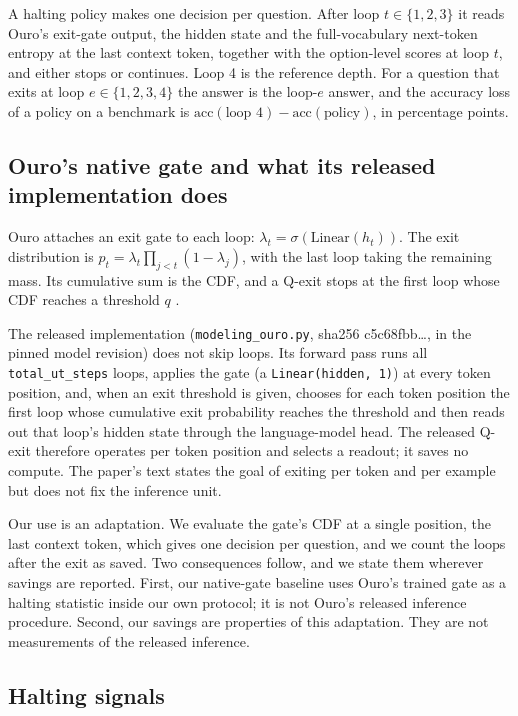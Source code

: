 A halting policy makes one decision per question. After loop \(t \in \{1,2,3\}\) it reads Ouro's exit-gate output, the hidden state and the full-vocabulary next-token entropy at the last context token, together with the option-level scores at loop \(t\), and either stops or continues. Loop 4 is the reference depth. For a question that exits at loop \(e \in \{1,2,3,4\}\) the answer is the loop-\(e\) answer, and the accuracy loss of a policy on a benchmark is \(\text{acc}(\text{loop }4) - \text{acc}(\text{policy})\), in percentage points.

\subsection{Ouro's native gate and what its released implementation does}

Ouro attaches an exit gate to each loop: \(\lambda_t = \sigma(\text{Linear}(h_t))\). The exit distribution is \(p_t = \lambda_t \prod_{j<t}(1-\lambda_j)\), with the last loop taking the remaining mass. Its cumulative sum is the CDF, and a Q-exit stops at the first loop whose CDF reaches a threshold \(q\) \citep{Zhu2025}.

The released implementation (\texttt{modeling\_ouro.py}, sha256 c5c68fbb\ldots, in the pinned model revision) does not skip loops. Its forward pass runs all \texttt{total\_ut\_steps} loops, applies the gate (a \texttt{Linear(hidden,\ 1)}) at every token position, and, when an exit threshold is given, chooses for each token position the first loop whose cumulative exit probability reaches the threshold and then reads out that loop's hidden state through the language-model head. The released Q-exit therefore operates per token position and selects a readout; it saves no compute. The paper's text states the goal of exiting per token and per example but does not fix the inference unit.

Our use is an adaptation. We evaluate the gate's CDF at a single position, the last context token, which gives one decision per question, and we count the loops after the exit as saved. Two consequences follow, and we state them wherever savings are reported. First, our native-gate baseline uses Ouro's trained gate as a halting statistic inside our own protocol; it is not Ouro's released inference procedure. Second, our savings are properties of this adaptation. They are not measurements of the released inference.

\subsection{Halting signals}

